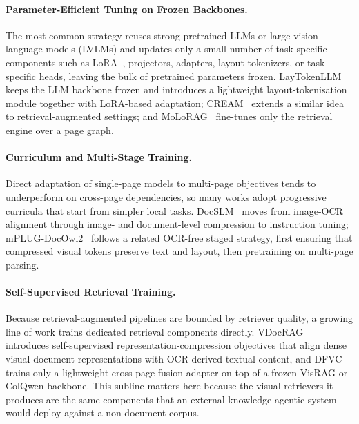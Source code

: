 \documentclass[11pt]{article}
\begin{document}
\paragraph{Parameter-Efficient Tuning on Frozen Backbones.}
The most common strategy reuses strong pretrained LLMs or large vision-language models (LVLMs) and updates only a small number of task-specific components such as LoRA~\cite{hu2021lora}, projectors, adapters, layout tokenizers, or task-specific heads, leaving the bulk of pretrained parameters frozen. LayTokenLLM~\cite{zhu2025simple} keeps the LLM backbone frozen and introduces a lightweight layout-tokenisation module together with LoRA-based adaptation; CREAM~\cite{zhang2024cream} extends a similar idea to retrieval-augmented settings; and MoLoRAG~\cite{wu2025molorag} fine-tunes only the retrieval engine over a page graph.

\paragraph{Curriculum and Multi-Stage Training.}
Direct adaptation of single-page models to multi-page objectives tends to underperform on cross-page dependencies, so many works adopt progressive curricula that start from simpler local tasks. DocSLM~\cite{hannan2025docslm} moves from image-OCR alignment through image- and document-level compression to instruction tuning; mPLUG-DocOwl2~\cite{hu2025mplug2} follows a related OCR-free staged strategy, first ensuring that compressed visual tokens preserve text and layout, then pretraining on multi-page parsing.

\paragraph{Self-Supervised Retrieval Training.}
Because retrieval-augmented pipelines are bounded by retriever quality, a growing line of work trains dedicated retrieval components directly. VDocRAG~\cite{tanaka2025vdocrag} introduces self-supervised representation-compression objectives that align dense visual document representations with OCR-derived textual content, and DFVC~\cite{qian2026accurate} trains only a lightweight cross-page fusion adapter on top of a frozen VisRAG or ColQwen backbone. This subline matters here because the visual retrievers it produces are the same components that an external-knowledge agentic system would deploy against a non-document corpus.
\end{document}
